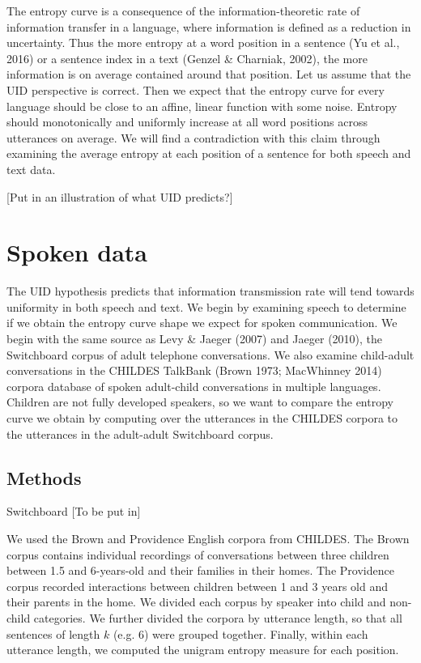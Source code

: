 \documentclass[10pt, letterpaper]{article}
\begin{document}
The entropy curve is a consequence of the information-theoretic rate of
information transfer in a language, where information is defined as a
reduction in uncertainty. Thus the more entropy at a word position in a
sentence (Yu et al., 2016) or a sentence index in a text (Genzel \&
Charniak, 2002), the more information is on average contained around
that position. Let us assume that the UID perspective is correct. Then
we expect that the entropy curve for every language should be close to
an affine, linear function with some noise. Entropy should monotonically
and uniformly increase at all word positions across utterances on
average. We will find a contradiction with this claim through examining
the average entropy at each position of a sentence for both speech and
text data.

{[}Put in an illustration of what UID predicts?{]}

\section{Spoken data}\label{spoken-data}

The UID hypothesis predicts that information transmission rate will tend
towards uniformity in both speech and text. We begin by examining speech
to determine if we obtain the entropy curve shape we expect for spoken
communication. We begin with the same source as Levy \& Jaeger (2007)
and Jaeger (2010), the Switchboard corpus of adult telephone
conversations. We also examine child-adult conversations in the CHILDES
TalkBank (Brown 1973; MacWhinney 2014) corpora database of spoken
adult-child conversations in multiple languages. Children are not fully
developed speakers, so we want to compare the entropy curve we obtain by
computing over the utterances in the CHILDES corpora to the utterances
in the adult-adult Switchboard corpus.

\subsection{Methods}\label{methods}

Switchboard {[}To be put in{]}

We used the Brown and Providence English corpora from CHILDES. The Brown
corpus contains individual recordings of conversations between three
children between 1.5 and 6-years-old and their families in their homes.
The Providence corpus recorded interactions between children between 1
and 3 years old and their parents in the home. We divided each corpus by
speaker into child and non-child categories. We further divided the
corpora by utterance length, so that all sentences of length \(k\) (e.g.
\(6\)) were grouped together. Finally, within each utterance length, we
computed the unigram entropy measure for each position.
\end{document}
